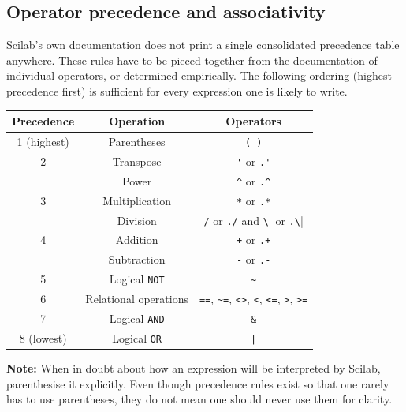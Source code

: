 	\subsection{Operator precedence and associativity}
		Scilab's own documentation does not print a single consolidated precedence table anywhere. These rules have to be pieced together from the documentation of individual operators, or determined empirically. The following ordering (highest precedence first) is sufficient for every expression one is likely to write.
		\begin{table}[h!]
			\centering
			\begin{tabular}{ccc}
				\toprule[1.5pt]
				{\textbf{Precedence}} & {\textbf{Operation}} & {\textbf{Operators}} \\
				\midrule[1.2pt]
				{1 (highest)} & {Parentheses} & {\verb|( )|} \\ \hline
				{2} & {Transpose} & {\verb|'| or \verb|.'|} \\
				{ } & {Power} & {\verb|^| or \verb|.^|} \\ \hline
				{3} & {Multiplication} & {\verb|*| or \verb|.*|} \\
				{ } & {Division} & {\verb|/| or \verb|./| and \verb|\| or \verb|.\|} \\ \hline
				{4} & {Addition} & {\verb|+| or \verb|.+|} \\
				{ } & {Subtraction} & {\verb|-| or \verb|.-|} \\ \hline
				{5} & {Logical \verb|NOT|} & {\verb|~|} \\ \hline
				{6} & {Relational operations} & {\verb|==|, \verb|~=|, \verb|<>|, \verb|<|, \verb|<=|, \verb|>|, \verb|>=|} \\ \hline
				{7} & {Logical \verb|AND|} & {\verb|&|} \\ \hline
				{8 (lowest)} & {Logical \verb|OR|} & {\texttt{|}} \\
				\bottomrule[1.5pt]
			\end{tabular}
		\end{table}
		
		\textbf{Note:} When in doubt about how an expression will be interpreted by Scilab, parenthesise it explicitly. Even though precedence rules exist so that one rarely has to use parentheses, they do not mean one should never use them for clarity.
